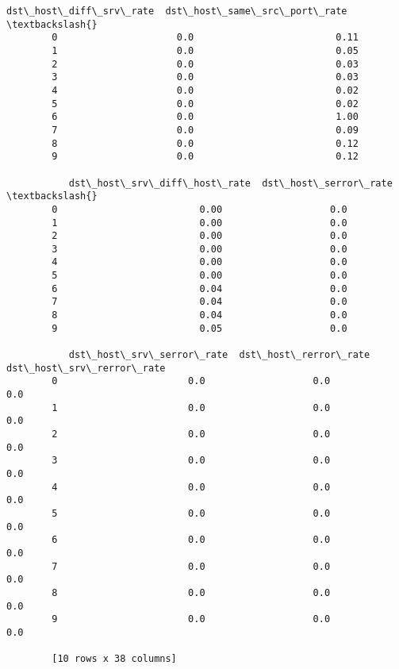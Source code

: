 \documentclass[11pt]{article}
\begin{document}
\begin{Verbatim}[commandchars=\\\{\}]
           dst\_host\_diff\_srv\_rate  dst\_host\_same\_src\_port\_rate  \textbackslash{}
        0                     0.0                         0.11   
        1                     0.0                         0.05   
        2                     0.0                         0.03   
        3                     0.0                         0.03   
        4                     0.0                         0.02   
        5                     0.0                         0.02   
        6                     0.0                         1.00   
        7                     0.0                         0.09   
        8                     0.0                         0.12   
        9                     0.0                         0.12   
        
           dst\_host\_srv\_diff\_host\_rate  dst\_host\_serror\_rate  \textbackslash{}
        0                         0.00                   0.0   
        1                         0.00                   0.0   
        2                         0.00                   0.0   
        3                         0.00                   0.0   
        4                         0.00                   0.0   
        5                         0.00                   0.0   
        6                         0.04                   0.0   
        7                         0.04                   0.0   
        8                         0.04                   0.0   
        9                         0.05                   0.0   
        
           dst\_host\_srv\_serror\_rate  dst\_host\_rerror\_rate  dst\_host\_srv\_rerror\_rate  
        0                       0.0                   0.0                       0.0  
        1                       0.0                   0.0                       0.0  
        2                       0.0                   0.0                       0.0  
        3                       0.0                   0.0                       0.0  
        4                       0.0                   0.0                       0.0  
        5                       0.0                   0.0                       0.0  
        6                       0.0                   0.0                       0.0  
        7                       0.0                   0.0                       0.0  
        8                       0.0                   0.0                       0.0  
        9                       0.0                   0.0                       0.0  
        
        [10 rows x 38 columns]
\end{Verbatim}
            
\end{document}
